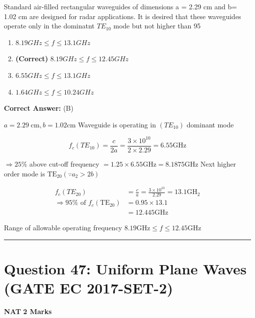 \documentclass[11pt,a4paper]{article}
\begin{document}
\noindent Standard air-filled rectangular waveguides of dimensions a = 2.29 cm and b= 1.02 cm are designed for radar applications. It is desired that these waveguides operate only in the dominatnt $TE_{10}$ mode but not higher than 95%


\begin{enumerate}[label=(\Alph*)]
    \item $8.19 GHz \leq f \leq 13.1 GHz$
    \item \textbf{(Correct)} $8.19 GHz \leq f \leq 12.45 GHz$
    \item $6.55 GHz \leq f \leq 13.1 GHz$
    \item $1.64 GHz \leq f \leq 10.24 GHz$
\end{enumerate}

\noindent \textbf{Correct Answer:} (B)

\begin{tcolorbox}[solbox, title=Detailed Solution -- Question 46]
$a=2.29 \;\mathrm{cm}, b=1.02 \mathrm{cm}$
 Waveguide is operating in $(TE _{10})$ dominant mode 

\[
f_{c}\left(T E_{10}\right)=\frac{c}{2 a}=\frac{3 \times 10^{10}}{2 \times 2.29}=6.55 \mathrm{GHz}
\]

$\Rightarrow 25 \%$ above cut-off frequency
$=1.25 \times 6.55 \mathrm{GHz}=8.1875 \mathrm{GHz}$
 Next higher order mode is $\mathrm{TE}_{20}\left(\because a_{2} > 2b\right)$

\[
\begin{aligned} f_{c}\left(T E_{20}\right) &=\frac{c}{a}=\frac{3 \times 10^{10}}{2.29}=13.1 \mathrm{GH}_{2} \\ \Rightarrow 95 \% \text { of } f_{c}\left(\mathrm{TE}_{20}\right) &=0.95 \times 13.1 \\ &=12.445 \mathrm{GHz} \end{aligned}
\]

 Range of allowable operating frequency
$8.19 \mathrm{GHz} \leq f \leq 12.45 \mathrm{GHz}$
\end{tcolorbox}

\vspace{1.5em}
\hrule
\vspace{1.5em}

\section*{Question 47: Uniform Plane Waves (GATE EC 2017-SET-2)}
\noindent \textbf{\color{primary}NAT} \hfill \textbf{\color{secondary}2 Marks}
\end{document}
